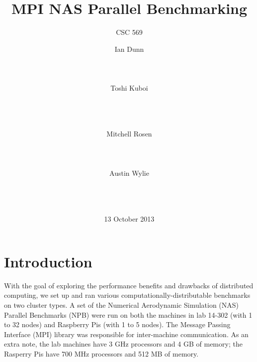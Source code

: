 \documentclass{acm_proc_article-sp}
\begin{document}
\raggedbottom

\title{MPI NAS Parallel Benchmarking}
\subtitle{CSC 569}

\author{
\alignauthor
Ian Dunn\\
       \\
       \\
       \\
\alignauthor
Toshi Kuboi\\
       \\
       \\
       \\
       \and %
\alignauthor
Mitchell Rosen\\
       \\
       \\
       \\
\alignauthor
Austin Wylie\\
       \\
       \\
       \\
}

\date{13 October 2013}

\maketitle

\section{Introduction}
With the goal of exploring the performance benefits and drawbacks of distributed computing, we set up and ran various computationally-distributable benchmarks on two cluster types. A set of the Numerical Aerodynamic Simulation (NAS) Parallel Benchmarks (NPB) were run on both the machines in lab 14-302 (with 1 to 32 nodes) and Raspberry Pis (with 1 to 5 nodes). The Message Passing Interface (MPI) library was responsible for inter-machine communication. As an extra note, the lab machines have 3 GHz processors and 4 GB of memory; the Rasperry Pis have 700 MHz processors and 512 MB of memory.
\end{document}

